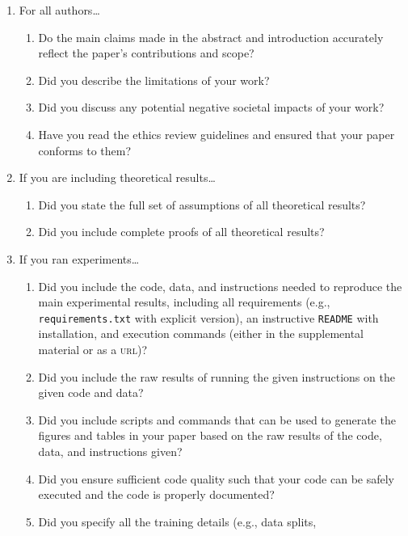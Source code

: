 \documentclass[11pt]{article}
\begin{document}
\begin{enumerate}
\item For all authors\dots
  \begin{enumerate}
  \item Do the main claims made in the abstract and introduction accurately
    reflect the paper's contributions and scope?
    \answerTODO{}
  \item Did you describe the limitations of your work?
    \answerTODO{}
  \item Did you discuss any potential negative societal impacts of your work?
    \answerTODO{}
  \item Have you read the ethics review guidelines and ensured that your paper
    conforms to them?
    \answerTODO{}
  \end{enumerate}
\item If you are including theoretical results\dots
  \begin{enumerate}
  \item Did you state the full set of assumptions of all theoretical results?
    \answerTODO{}
  \item Did you include complete proofs of all theoretical results?
    \answerTODO{}
  \end{enumerate}
\item If you ran experiments\dots
  \begin{enumerate}
  \item Did you include the code, data, and instructions needed to reproduce the
    main experimental results, including all requirements (e.g.,
    \texttt{requirements.txt} with explicit version), an instructive
    \texttt{README} with installation, and execution commands (either in the
    supplemental material or as a \textsc{url})?
    \answerTODO{}
  \item Did you include the raw results of running the given instructions on the
    given code and data?
    \answerTODO{}
  \item Did you include scripts and commands that can be used to generate the
    figures and tables in your paper based on the raw results of the code, data,
    and instructions given?
    \answerTODO{}
  \item Did you ensure sufficient code quality such that your code can be safely
    executed and the code is properly documented?
    \answerTODO{}
  \item Did you specify all the training details (e.g., data splits,

\end{enumerate}
\end{enumerate}
\end{document}
